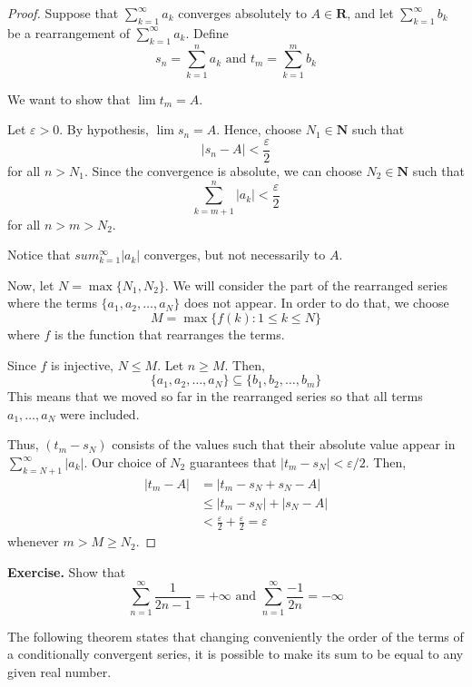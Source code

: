 \documentclass[tikz,12pt,a4paper]{article}
\theoremstyle{definition}
\begin{document}
\begin{proof}
	Suppose that $\sum_{k=1}^\infty a_k$ converges absolutely to $A \in \textbf{R}$, and let $\sum_{k=1}^\infty b_k$ be a rearrangement of $\sum_{k=1}^\infty a_k$. Define
	\[
		s_n = \sum_{k=1}^n a_k \text{ and } t_m = \sum_{k=1}^m b_k
	\]
	
	We want to show that $\lim t_m = A$. 
	
	Let $\varepsilon > 0$. By hypothesis, $\lim s_n = A$. Hence, choose $N_1 \in \textbf{N}$ such that
	\[
		|s_n - A| < \frac{\varepsilon}{2}
	\]
	for all $n > N_1$. Since the convergence is absolute, we can choose $N_2 \in \textbf{N}$ such that
	\[
		\sum_{k=m+1}^n |a_k| < \frac{\varepsilon}{2}
	\]
	for all $n > m > N_2$.
	
	Notice that $sum_{k=1}^\infty |a_k|$ converges, but not necessarily to $A$. 
	
	Now, let $N = \max \{ N_1, N_2 \}$. We will consider the part of the rearranged series where the terms $\{ a_1, a_2, \ldots, a_N \}$ does not appear. In order to do that, we choose
	\[
		M = \max \{ f(k) : 1 \leq k \leq N \}
	\]
	where $f$ is the function that rearranges the terms.
	
	Since $f$ is injective, $N \leq M$. Let $n \geq M$. Then,
	\[
		\{ a_1, a_2, \ldots, a_N \} \subseteq \{ b_1, b_2, \ldots, b_m \}
	\]
	This means that we moved so far in the rearranged series so that all terms $a_1, \ldots, a_N$ were included. 
	
	Thus, $(t_m - s_N)$ consists of the values such that their absolute value appear in $\sum_{k=N+1}^\infty |a_k|$. Our choice of $N_2$ guarantees that $|t_m - s_N| < \varepsilon / 2$. Then,
	\begin{equation*}
		\begin{aligned}
			|t_m - A| &= |t_m - s_N + s_N - A| \\
			&\leq |t_m - s_N| + |s_N - A| \\
			&< \frac{\varepsilon}{2} + \frac{\varepsilon}{2} = \varepsilon
		\end{aligned}
	\end{equation*}
	whenever $m > M \geq N_2$.
\end{proof}

\textbf{Exercise.} Show that
\[
	\sum_{n=1}^\infty \frac{1}{2n-1} = + \infty \text{ and } \sum_{n=1}^\infty \frac{-1}{2n} = - \infty
\]

The following theorem states that changing conveniently the order of the terms of a conditionally convergent series, it is possible to make its sum to be equal to any given real number.
\end{document}
